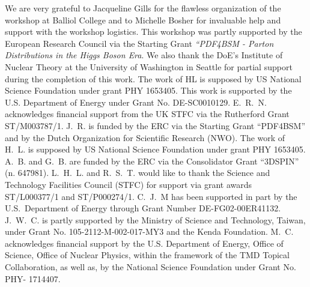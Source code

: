 We are very grateful to Jacqueline Gills for the flawless organization
of the workshop at Balliol College and to Michelle Bosher for
invaluable help and support with the workshop logistics.
%
This workshop was partly supported by the European Research Council via
the Starting Grant {\it ``PDF4BSM - Parton Distributions in the
  Higgs Boson Era}.
%
We also thank the DoE's Institute of Nuclear Theory at the University of Washington
in Seattle for partial support during the completion of this work. 
%
The work of HL is supposed by US National Science Foundation
under grant PHY 1653405.
%
This work is supported by
the U.S. Department of Energy under Grant No. DE-SC0010129.
%
E.~R.~N. acknowledges financial support from the
UK STFC via the Rutherford Grant ST/M003787/1.
%
J.~R. is funded by the ERC via the Starting Grant ``PDF4BSM'' and by the
Dutch Organization for Scientific Research (NWO).
%
The work of H.~L. is supposed by US National Science Foundation under grant PHY 1653405. 
%
A.~B. and G.~B. are funded by the ERC via the Consolidator
Grant “3DSPIN” (n. 647981). 
%
L.~H.~L. and R.~S.~T. would like to thank the Science and Technology Facilities Council
(STFC) for support via grant awards ST/L000377/1 and ST/P000274/1. 
%
C.~J.~M has been supported in part by the U.S.~Department of Energy through
Grant Number DE-FG02-00ER41132.
%
J.~W.~C. is partly supported by the Ministry of Science and Technology, Taiwan,
under Grant No. 105-2112-M-002-017-MY3 and the Kenda Foundation.
%
M.~C. acknowledges financial support by the U.S. Department of Energy, Office of Science, Office of Nuclear Physics, within the framework of the TMD Topical Collaboration, as well as,
by the National Science Foundation under Grant No. PHY- 1714407. 
